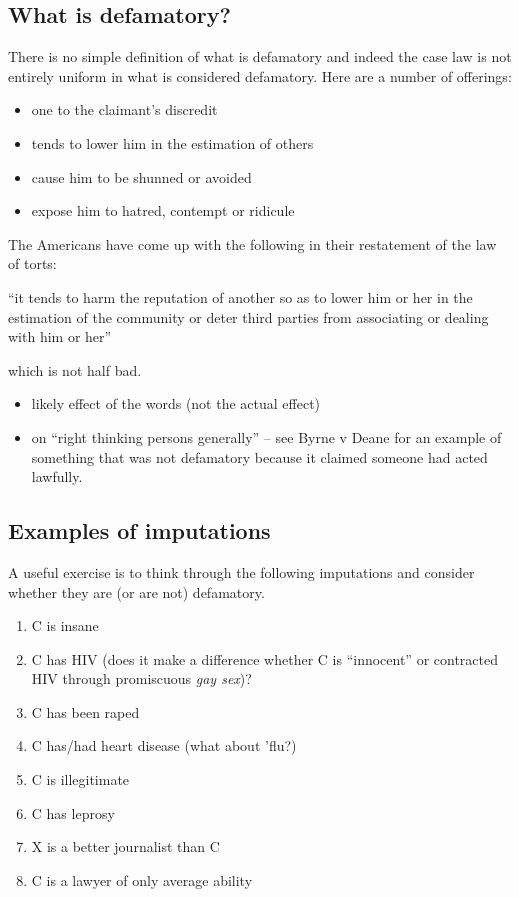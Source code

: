\documentclass[]{article}
\begin{document}
\subsection{What is defamatory?}

There is no simple definition of what is defamatory and indeed the case
law is not entirely uniform in what is considered defamatory. Here are a
number of offerings:

\begin{itemize}
\item
  one to the claimant's discredit
\item
  tends to lower him in the estimation of others
\item
  cause him to be shunned or avoided
\item
  expose him to hatred, contempt or ridicule
\end{itemize}

The Americans have come up with the following in their restatement of
the law of torts:

``it tends to harm the reputation of another so as to lower him or her
in the estimation of the community or deter third parties from
associating or dealing with him or her''

which is not half bad.

\begin{itemize}
\item
  likely effect of the words (not the actual effect)
\item
  on ``right thinking persons generally'' -- see Byrne v Deane for an
  example of something that was not defamatory because it claimed
  someone had acted lawfully.
\end{itemize}

\subsection{Examples of imputations}

A useful exercise is to think through the following imputations and
consider whether they are (or are not) defamatory.

\begin{enumerate}
\item
  C is insane
\item
  {C has HIV (does it make a difference whether C is ``innocent'' or
  contracted HIV through promiscuous }\emph{{gay sex}}{{)?}}
\item
  C has been raped
\item
  C has/had heart disease (what about 'flu?)
\item
  C is illegitimate
\item
  C has leprosy
\item
  X is a better journalist than C
\item
  C is a lawyer of only average ability
\end{enumerate}
\end{document}
